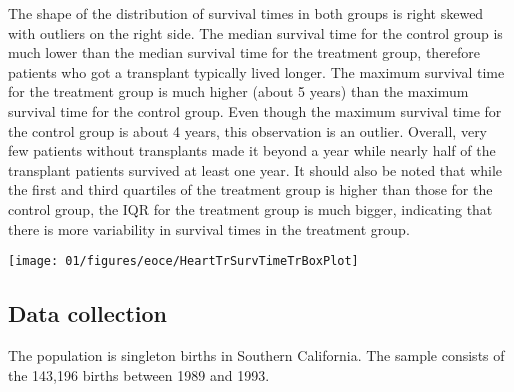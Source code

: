 %

\noindent\begin{minipage}[c]{0.45\textwidth}
{
The shape of the distribution of survival times in both groups is right skewed with outliers on the right side. The median survival time for the control group is much lower than the median survival time for the treatment group, therefore patients who got a transplant typically lived longer. The maximum survival time for the treatment group is much higher (about 5 years) than the maximum survival time for the control group. Even though the maximum survival time for the control group is about 4 years, this observation is an outlier. Overall, very few patients without transplants made it beyond a year while nearly half of the transplant patients survived at least one year. It should also be noted that while the first and third quartiles of the treatment group is higher than those for the control group, the IQR for the treatment group is much bigger, indicating that there is more variability in survival times in the treatment group.
}
\end{minipage}
\begin{minipage}[c]{0.54\textwidth}
\begin{center}
\texttt{[image: 01/figures/eoce/HeartTrSurvTimeTrBoxPlot]}
\end{center}
\end{minipage}


\subsection{Data collection}


{The population is singleton births in Southern California. The sample consists of the 143,196 births between 1989 and 1993.}

%

